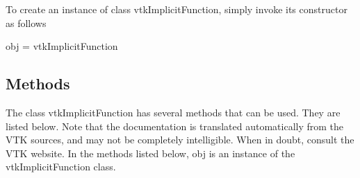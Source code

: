 To create an instance of class vtk\-Implicit\-Function, simply invoke its constructor as follows \begin{DoxyVerb}  obj = vtkImplicitFunction
\end{DoxyVerb}
 \hypertarget{vtkwidgets_vtkxyplotwidget_Methods}{}\subsection{Methods}\label{vtkwidgets_vtkxyplotwidget_Methods}
The class vtk\-Implicit\-Function has several methods that can be used. They are listed below. Note that the documentation is translated automatically from the V\-T\-K sources, and may not be completely intelligible. When in doubt, consult the V\-T\-K website. In the methods listed below, {\ttfamily obj} is an instance of the vtk\-Implicit\-Function class. 
